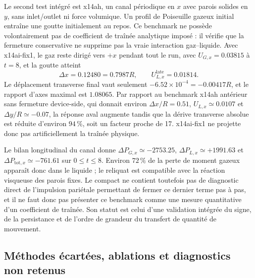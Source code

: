 \documentclass[11pt,a4paper]{article}
\begin{document}
Le second test intégré est x14ah, un canal périodique en $x$ avec parois solides en $y$, sans inlet/outlet ni force volumique. Un profil de Poiseuille gazeux initial entraîne une goutte initialement au repos. Ce benchmark ne possède volontairement pas de coefficient de traînée analytique imposé : il vérifie que la fermeture conservative ne supprime pas la vraie interaction gaz--liquide. Avec x14ai-fix1, le gaz reste dirigé vers $+x$ pendant tout le run, avec $U_{G,x}=0.03815$ à $t=8$, et la goutte atteint
\begin{equation}
  \Delta x=0.12480=0.7987R,
  \qquad
  U_{L,x}^{\mathrm{late}}=0.01814.
\end{equation}
Le déplacement transverse final vaut seulement $-6.52\times10^{-4}= -0.00417R$, et le rapport d'axes maximal est $1.08065$. Par rapport au benchmark x14ah antérieur sans fermeture device-side, qui donnait environ $\Delta x/R=0.51$, $U_{L,x}\simeq0.0107$ et $\Delta y/R\simeq-0.07$, la réponse aval augmente tandis que la dérive transverse absolue est réduite d'environ $94\,\%$, soit un facteur proche de 17. x14ai-fix1 ne projette donc pas artificiellement la traînée physique.

Le bilan longitudinal du canal donne $\Delta P_{G,x}\simeq-2753.25$, $\Delta P_{L,x}\simeq+1991.63$ et $\Delta P_{\mathrm{tot},x}\simeq-761.61$ sur $0\le t\le8$. Environ $72\,\%$ de la perte de moment gazeux apparaît donc dans le liquide ; le reliquat est compatible avec la réaction visqueuse des parois fixes. Le compact ne contient toutefois pas de diagnostic direct de l'impulsion pariétale permettant de fermer ce dernier terme pas à pas, et il ne faut donc pas présenter ce benchmark comme une mesure quantitative d'un coefficient de traînée. Son statut est celui d'une validation intégrée du signe, de la persistance et de l'ordre de grandeur du transfert de quantité de mouvement.

\subsection{Méthodes écartées, ablations et diagnostics non retenus}
\end{document}
